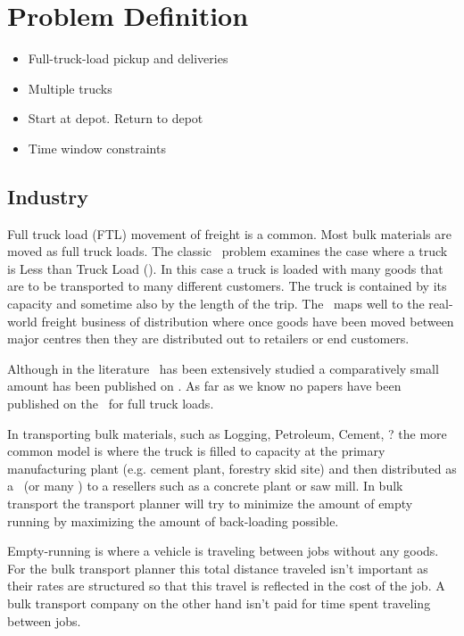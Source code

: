 
\chapter{Problem Definition}

\begin{itemize}
	\item Full-truck-load pickup and deliveries
	\item Multiple trucks
	\item Start at depot. Return to depot
	\item Time window constraints
\end{itemize}

\section{Industry}
Full truck load (FTL) movement of freight is a common. Most bulk materials are moved as full truck loads. The classic \VRP\ problem examines the case where a truck is Less than Truck Load (\LTL). In this case a truck is loaded with many goods that are to be transported to many different customers. The truck is contained by its capacity and sometime also by the length of the trip. The \VRP\ maps well to the real-world freight business of distribution where once goods have been moved between major centres then they are distributed out to retailers or end customers.

Although in the literature \VRP\ has been extensively studied a comparatively small amount has been published on \PDP. As far as we know no papers have been published on the \PDP\ for full truck loads.     

In transporting bulk materials, such as Logging, Petroleum, Cement, ? the more common model is where the truck is filled to capacity at the primary manufacturing plant (e.g. cement plant, forestry skid site) and then distributed as a \FTL\ (or many \FTL) to a resellers such as a concrete plant or saw mill. In bulk transport the transport planner will try to minimize the amount of empty running by maximizing the amount of back-loading possible.

Empty-running is where a vehicle is traveling between jobs without any goods. For the bulk transport planner this total distance traveled isn't important as their rates are structured so that this travel is reflected in the cost of the job. A bulk transport company on the other hand isn't paid for time spent traveling between jobs.

